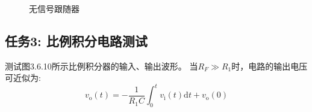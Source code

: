 \documentclass[a4paper,11pt,UTF8]{article}
\begin{document}
\begin{figure}[H]
	\centering
	\setcounter{subfigure}{0}
	\caption*{无信号跟随器}
\end{figure}
\subsection{任务3: 比例积分电路测试}
测试图3.6.10所示比例积分器的输入、输出波形。 当$R_F\gg R_1$时，电路的输出电压可近似为:
$$
	v_{\mathrm{o}}(t)=-\frac{1}{R_{1}C}\int_{0}^{t}v_{\mathrm{i}}(t)\mathrm{d}t+v_{\mathrm{o}}(0)
$$
\end{document}
